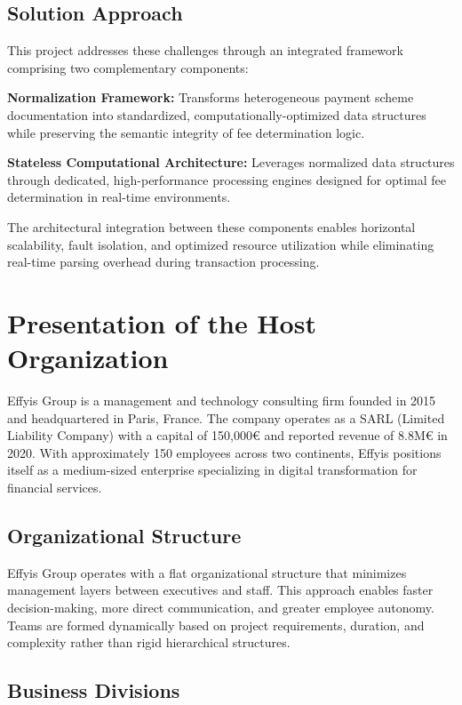 \subsection{Solution Approach}

This project addresses these challenges through an integrated framework comprising two complementary components:

\textbf{Normalization Framework:} Transforms heterogeneous payment scheme documentation into standardized, computationally-optimized data structures while preserving the semantic integrity of fee determination logic.

\textbf{Stateless Computational Architecture:} Leverages normalized data structures through dedicated, high-performance processing engines designed for optimal fee determination in real-time environments.

The architectural integration between these components enables horizontal scalability, fault isolation, and optimized resource utilization while eliminating real-time parsing overhead during transaction processing.

\section{Presentation of the Host Organization}

Effyis Group is a management and technology consulting firm founded in 2015 and headquartered in Paris, France. The company operates as a SARL (Limited Liability Company) with a capital of 150,000€ and reported revenue of 8.8M€ in 2020. With approximately 150 employees across two continents, Effyis positions itself as a medium-sized enterprise specializing in digital transformation for financial services.

\subsection{Organizational Structure}

Effyis Group operates with a flat organizational structure that minimizes management layers between executives and staff. This approach enables faster decision-making, more direct communication, and greater employee autonomy. Teams are formed dynamically based on project requirements, duration, and complexity rather than rigid hierarchical structures.

\subsection{Business Divisions}


